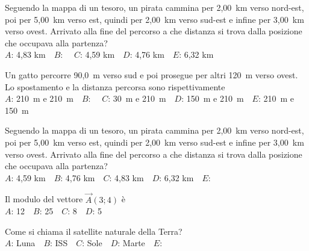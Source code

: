 \mcquestionfooter



\def\mcquestionnumber{12}


\mcquestionheader Seguendo la mappa di un tesoro, un pirata cammina per 2,00~km verso nord-est, poi per 5,00~km verso est, quindi per 2,00~km verso sud-est e infine per 3,00~km verso ovest. Arrivato alla fine del percorso a che distanza si trova dalla posizione che occupava alla partenza?\\
{$A$}: 4,83 km\ \ {$B$}: \ \ {$C$}: 4,59 km\ \ {$D$}: 4,76 km\ \ {$E$}: 6,32 km\ \ 

\mcquestionfooter



\mcpaperfooter

\def\mcserialnumber{18}
\mcpaperheader


\def\mcquestionnumber{1}


\mcquestionheader Un gatto percorre 90,0~m verso sud e poi prosegue per altri 120~m verso ovest. Lo spostamento e la distanza percorsa sono rispettivamente\\
{$A$}: 210~m e 210~m\ \ {$B$}: \ \ {$C$}: 30~m e 210~m\ \ {$D$}: 150~m e 210~m\ \ {$E$}: 210~m e 150~m\ \ 

\mcquestionfooter



\def\mcquestionnumber{2}


\mcquestionheader Seguendo la mappa di un tesoro, un pirata cammina per 2,00~km verso nord-est, poi per 5,00~km verso est, quindi per 2,00~km verso sud-est e infine per 3,00~km verso ovest. Arrivato alla fine del percorso a che distanza si trova dalla posizione che occupava alla partenza?\\
{$A$}: 4,59 km\ \ {$B$}: 4,76 km\ \ {$C$}: 4,83 km\ \ {$D$}: 6,32 km\ \ {$E$}: \ \ 

\mcquestionfooter



\def\mcquestionnumber{3}


\mcquestionheader Il modulo del vettore $\vec{A}(3;4)$ è\\
{$A$}: 12\ \ {$B$}: 25\ \ {$C$}: 8\ \ {$D$}: 5\ \ 

\mcquestionfooter



\def\mcquestionnumber{4}


\mcquestionheader Come si chiama il satellite naturale della Terra?\\
{$A$}: Luna\ \ {$B$}: ISS\ \ {$C$}: Sole\ \ {$D$}: Marte\ \ {$E$}: \ \ 

